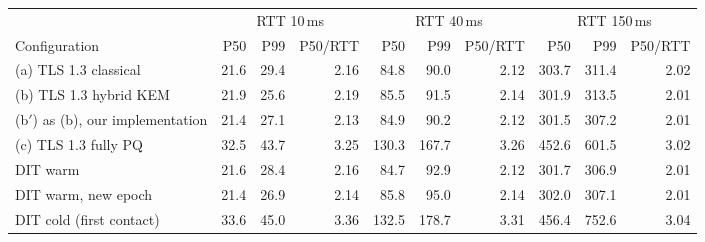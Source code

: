 \begin{tabular}{lrrrrrrrrr}
\toprule
 & \multicolumn{3}{c}{RTT 10\,ms} & \multicolumn{3}{c}{RTT 40\,ms} & \multicolumn{3}{c}{RTT 150\,ms} \\
\cmidrule(lr){2-4}\cmidrule(lr){5-7}\cmidrule(lr){8-10}
Configuration & P50 & P99 & P50/RTT & P50 & P99 & P50/RTT & P50 & P99 & P50/RTT \\
\midrule
(a) TLS 1.3 classical & 21.6 & 29.4 & 2.16 & 84.8 & 90.0 & 2.12 & 303.7 & 311.4 & 2.02 \\
(b) TLS 1.3 hybrid KEM & 21.9 & 25.6 & 2.19 & 85.5 & 91.5 & 2.14 & 301.9 & 313.5 & 2.01 \\
(b$'$) as (b), our implementation & 21.4 & 27.1 & 2.13 & 84.9 & 90.2 & 2.12 & 301.5 & 307.2 & 2.01 \\
(c) TLS 1.3 fully PQ & 32.5 & 43.7 & 3.25 & 130.3 & 167.7 & 3.26 & 452.6 & 601.5 & 3.02 \\
DIT warm & 21.6 & 28.4 & 2.16 & 84.7 & 92.9 & 2.12 & 301.7 & 306.9 & 2.01 \\
DIT warm, new epoch & 21.4 & 26.9 & 2.14 & 85.8 & 95.0 & 2.14 & 302.0 & 307.1 & 2.01 \\
DIT cold (first contact) & 33.6 & 45.0 & 3.36 & 132.5 & 178.7 & 3.31 & 456.4 & 752.6 & 3.04 \\
\bottomrule
\end{tabular}
